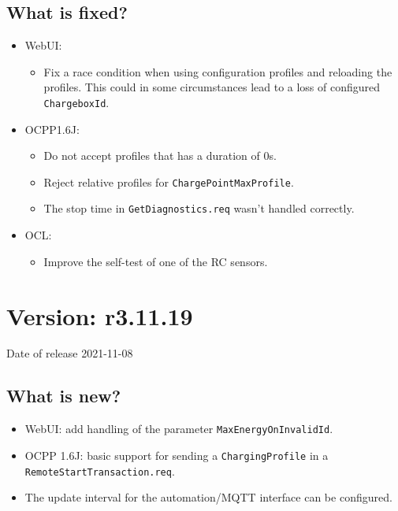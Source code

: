 \documentclass{scrartcl}
\begin{document}
\subsection*{What is fixed?}
\begin{itemize}
\item WebUI:
  \begin{itemize}
  \item Fix a race condition when using configuration profiles and reloading
    the profiles. This could in some circumstances lead to a loss of
    configured \verb|ChargeboxId|.
  \end{itemize}
\item OCPP1.6J:
  \begin{itemize}
  \item Do not accept profiles that has a duration of 0s.
  \item Reject relative profiles for \verb|ChargePointMaxProfile|.
  \item The stop time in \verb|GetDiagnostics.req| wasn't handled correctly.
  \end{itemize}
\item OCL:
  \begin{itemize}
  \item Improve the self-test of one of the RC sensors.
  \end{itemize}
\end{itemize}

\section{Version: r3.11.19}
Date of release 2021-11-08
\subsection*{What is new?}
\begin{itemize}
\item WebUI: add handling of the parameter \verb|MaxEnergyOnInvalidId|.
\item OCPP 1.6J: basic support for sending a \verb|ChargingProfile| in a
  \verb|RemoteStartTransaction.req|.
\item The update interval for the automation/MQTT interface can be
  configured.
\end{itemize}
\end{document}
